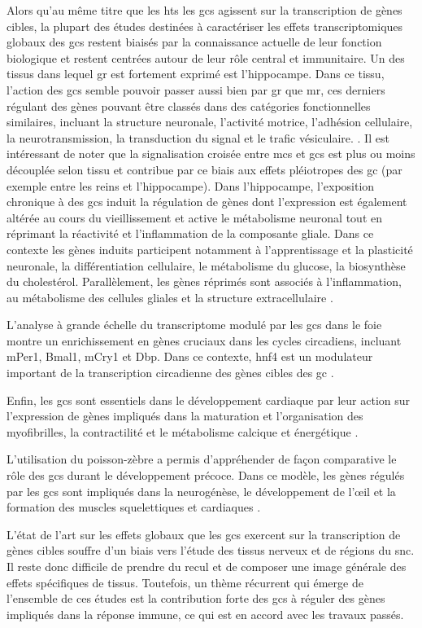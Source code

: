 \documentclass[../main.tex]{subfiles}
\begin{document}
		Alors qu'au même titre que les \glspl{ht} les \glspl{gc} agissent sur la transcription de gènes cibles, la plupart des études destinées à caractériser les effets transcriptomiques globaux des \glspl{gc} restent biaisés par la connaissance actuelle de leur fonction biologique et restent centrées autour de leur rôle central et immunitaire.
		Un des tissus dans lequel \gls{gr} est fortement exprimé est l'hippocampe.
		Dans ce tissu, l'action des \glspl{gc} semble pouvoir passer aussi bien par \gls{gr} que \gls{mr}, ces derniers régulant des gènes pouvant être classés dans des catégories fonctionnelles similaires, incluant la structure neuronale, l'activité motrice, l'adhésion cellulaire, la neurotransmission, la transduction du signal et le trafic vésiculaire. \citep{Datson2001}.
		Il est intéressant de noter que la signalisation croisée entre \glspl{mc} et \glspl{gc} est plus ou moins découplée selon tissu et contribue par ce biais aux effets pléiotropes des \gls{gc} (par exemple entre les reins et l'hippocampe).
		Dans l'hippocampe, l'exposition chronique à des \glspl{gc} induit la régulation de gènes dont l'expression est également altérée au cours du vieillissement et active le métabolisme neuronal tout en réprimant la réactivité et l'inflammation de la composante gliale.
		Dans ce contexte les gènes induits participent notamment à l'apprentissage et la plasticité neuronale, la différentiation cellulaire, le métabolisme du glucose, la biosynthèse du cholestérol.
		Parallèlement, les gènes réprimés sont associés à l'inflammation, au métabolisme des cellules gliales et la structure extracellulaire \citep{Chen2013b,Carter2012}.
		\par
		L'analyse à grande échelle du transcriptome modulé par les \glspl{gc} dans le foie montre un enrichissement en gènes cruciaux dans les cycles circadiens, incluant mPer1, Bmal1, mCry1 et Dbp.
		Dans ce contexte, \gls{hnf4} est un modulateur important de la transcription circadienne des gènes cibles des \gls{gc} \citep{Reddy2007}.
		\par
		Enfin, les \glspl{gc} sont essentiels dans le développement cardiaque par leur action sur l'expression de gènes impliqués dans la maturation et l'organisation des myofibrilles, la contractilité et le métabolisme calcique et énergétique \cite{Rog-Zielinska2013}.
		\par
		L'utilisation du poisson-zèbre a permis d'appréhender de façon comparative le rôle des \glspl{gc} durant le développement précoce.
		Dans ce modèle, les gènes régulés par les \glspl{gc} sont impliqués dans la neurogénèse, le développement de l'œil et la formation des muscles squelettiques et cardiaques \citep{Nesan2013}.
		\par
		L'état de l'art sur les effets globaux que les \glspl{gc} exercent sur la transcription de gènes cibles souffre d'un biais vers l'étude des tissus nerveux et de régions du \gls{snc}.
		Il reste donc difficile de prendre du recul et de composer une image générale des effets spécifiques de tissus.
		Toutefois, un thème récurrent qui émerge de l'ensemble de ces études est la contribution forte des \glspl{gc} à réguler des gènes impliqués dans la réponse immune, ce qui est en accord avec les travaux passés.

\end{document}
